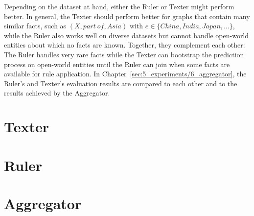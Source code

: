 Depending on the dataset at hand, either the Ruler or Texter might perform better. In general, the Texter should perform better for graphs that contain many similar facts, such as $(X, part~of, Asia)$ with $e \in \{China, India, Japan, \dots\}$, while the Ruler also works well on diverse datasets but cannot handle open-world entities about which no facts are known. Together, they complement each other: The Ruler handles very rare facts while the Texter can bootstrap the prediction process on open-world entities until the Ruler can join when some facts are available for rule application. In Chapter~\ref{sec:5_experiments/6_aggregator}, the Ruler's and Texter's evaluation results are compared to each other and to the results achieved by the Aggregator.

\section{Texter}
\label{sec:4_approach/1_texter}



\section{Ruler}
\label{sec:4_approach/2_ruler}



\section{Aggregator}
\label{sec:4_approach/3_aggregator}


